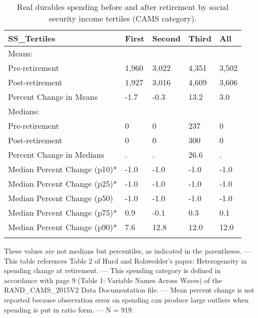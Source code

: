 \begin{table}[tbp] \centering
{}

\caption{Real durables spending before and after retirement by social security income tertiles (CAMS category).}
\begin{tabularx}{\textwidth}{lCCCC}

\toprule
{SS\_Tertiles}&{First}&{Second}&{Third}&{All} \tabularnewline
\midrule\addlinespace[1.5ex]
Means:&&&& \tabularnewline
\midrule Pre-retirement&1,960&3,022&4,351&3,502 \tabularnewline
Post-retirement&1,927&3,016&4,609&3,606 \tabularnewline
Percent Change in Means&-1.7&-0.3&13.2&3.0 \tabularnewline
\midrule Medians:&&&& \tabularnewline
\midrule Pre-retirement&0&0&237&0 \tabularnewline
Post-retirement&0&0&300&0 \tabularnewline
Percent Change in Medians&.&.&26.6&. \tabularnewline
Median Percent Change (p10)*&-1.0&-1.0&-1.0&-1.0 \tabularnewline
Median Percent Change (p25)*&-1.0&-1.0&-1.0&-1.0 \tabularnewline
Median Percent Change (p50)&-1.0&-1.0&-1.0&-1.0 \tabularnewline
Median Percent Change (p75)*&0.9&-0.1&0.3&0.1 \tabularnewline
Median Percent Change (p90)*&7.6&12.8&12.0&12.0 \tabularnewline
\bottomrule \addlinespace[1.5ex]

\end{tabularx}
\begin{flushleft}
\footnotesize *These values are not medians but percentiles, as indicated in the parentheses. \linebreak --- \linebreak This table references Table 2 of Hurd and Rohwedder's paper: Heterogeneity in spending change at retirement. \linebreak --- \linebreak This spending category is defined in accordance with page 9 (Table 1: Variable Names Across Waves) of the RAND\_CAMS\_2015V2 Data Documentation file. \linebreak --- \linebreak Mean percent change is not reported because observation error on spending can produce large outliers when spending is put in ratio form. \linebreak --- \linebreak N = 919.
\end{flushleft}
\end{table}
